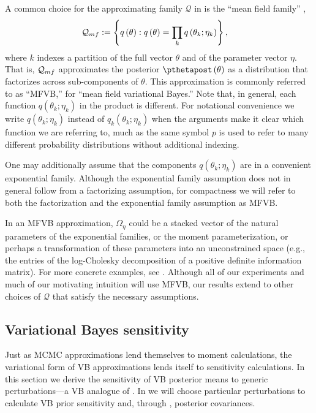 \documentclass{article}\usepackage[]{graphicx}\usepackage[]{color}
\theoremstyle{definition}
\theoremstyle{plain}
\theoremstyle{plain}
\theoremstyle{plain}
\theoremstyle{definition}
\theoremstyle{plain}
\theoremstyle{plain}
\begin{document}
A common choice for the approximating family
$\mathcal{Q}$ in 
is the ``mean field family'' \citep{wainwright2008graphical,blei:2016:variational},
\begin{align}
\mathcal{Q}_{mf} & :=\left\{ q\left(\theta\right):q\left(\theta\right) =
    \prod_{k}q\left(\theta_{k};\eta_{k}\right)\right\} ,
    \label{eq:q_mean_field_family}
\end{align}
where $k$ indexes a partition of the full vector $\theta$ and of the parameter
vector $\eta$. That is, $\mathcal{Q}_{mf}$ approximates the posterior
$\pthetapost\left(\theta\right)$ as a distribution that factorizes across
sub-components of $\theta$. This approximation is commonly referred to as
``MFVB,'' for ``mean field variational Bayes.'' Note that, in general, each
function $q\left(\theta_{k};\eta_{k}\right)$ in the product is different. For
notational convenience we write $q\left(\theta_{k};\eta_{k}\right)$ instead of
$q_{k}\left(\theta_{k};\eta_{k}\right)$ when the arguments make it clear which
function we are referring to, much as the same symbol $p$ is used to refer to
many different probability distributions without additional indexing.

One may additionally assume that the components
$q\left(\theta_{k};\eta_{k}\right)$ are in a convenient exponential family.
Although the exponential family assumption does not in general follow from a
factorizing assumption, for compactness we will refer to both the factorization
and the exponential family assumption as MFVB.

In an MFVB approximation, $\Omega_{\eta}$ could be a stacked vector
of the natural parameters of the exponential families, or the moment
parameterization, or perhaps a transformation of these parameters
into an unconstrained space (e.g., the entries of the log-Cholesky decomposition
of a positive definite information matrix). For more concrete examples,
see . Although all of our experiments
and much of our motivating intuition will use MFVB, our results extend
to other choices of $\mathcal{Q}$ that satisfy the necessary assumptions.





\subsection{Variational Bayes sensitivity\label{subsec:vb_sensitivity} }

Just as MCMC approximations lend themselves to moment calculations,
the variational form of VB approximations lends itself to sensitivity
calculations. In this section we derive the sensitivity of VB posterior
means to generic perturbations---a VB analogue of .
In  we will choose particular
perturbations to calculate VB prior sensitivity and, through ,
posterior covariances.
\end{document}
